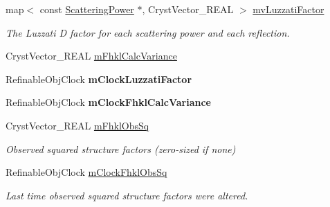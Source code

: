 \begin{DoxyCompactItemize}
\mbox{\label{class_obj_cryst_1_1_scattering_data_a8b9610ceeee8a68a39fc2f13e14d0391}} 
map$<$ const \mbox{\hyperlink{class_obj_cryst_1_1_scattering_power}{Scattering\+Power}} $\ast$, Cryst\+Vector\+\_\+\+R\+E\+AL $>$ \mbox{\hyperlink{class_obj_cryst_1_1_scattering_data_a8b9610ceeee8a68a39fc2f13e14d0391}{mv\+Luzzati\+Factor}}
\begin{DoxyCompactList}\small\item\em The Luzzati \textquotesingle{}D\textquotesingle{} factor for each scattering power and each reflection. \end{DoxyCompactList}\item 
Cryst\+Vector\+\_\+\+R\+E\+AL \mbox{\hyperlink{class_obj_cryst_1_1_scattering_data_a85ab0dd2973824fc2ad62fb6fef2e274}{m\+Fhkl\+Calc\+Variance}}
\item 
\mbox{\label{class_obj_cryst_1_1_scattering_data_a20ce8091b6bf08d1a37cdebb6e254ac1}} 
Refinable\+Obj\+Clock {\bfseries m\+Clock\+Luzzati\+Factor}
\item 
\mbox{\label{class_obj_cryst_1_1_scattering_data_a401ebb00cb9677b9f2faf62ed326c8da}} 
Refinable\+Obj\+Clock {\bfseries m\+Clock\+Fhkl\+Calc\+Variance}
\item 
\mbox{\label{class_obj_cryst_1_1_scattering_data_a71ebbc98f69dab63f03d7fb032228e1e}} 
Cryst\+Vector\+\_\+\+R\+E\+AL \mbox{\hyperlink{class_obj_cryst_1_1_scattering_data_a71ebbc98f69dab63f03d7fb032228e1e}{m\+Fhkl\+Obs\+Sq}}
\begin{DoxyCompactList}\small\item\em Observed squared structure factors (zero-\/sized if none) \end{DoxyCompactList}\item 
\mbox{\label{class_obj_cryst_1_1_scattering_data_a1ea122e6d6eb2c987a7e4f59ec111714}} 
Refinable\+Obj\+Clock \mbox{\hyperlink{class_obj_cryst_1_1_scattering_data_a1ea122e6d6eb2c987a7e4f59ec111714}{m\+Clock\+Fhkl\+Obs\+Sq}}
\begin{DoxyCompactList}\small\item\em Last time observed squared structure factors were altered. \end{DoxyCompactList}\end{DoxyCompactItemize}



